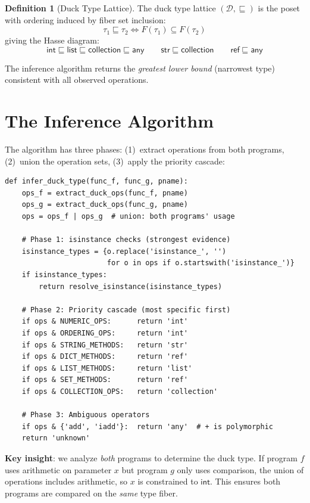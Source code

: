 \documentclass[11pt,a4paper]{report}
\theoremstyle{definition}
\newtheorem{definition}{Definition}[chapter]
\theoremstyle{plain}
\begin{document}
\begin{definition}[Duck Type Lattice]
The duck type lattice $(\mathcal{D}, \sqsubseteq)$ is the poset
with ordering induced by fiber set inclusion:
\[
  \tau_1 \sqsubseteq \tau_2 \iff F(\tau_1) \subseteq F(\tau_2)
\]
giving the Hasse diagram:
\[
  \mathsf{int} \sqsubseteq \mathsf{list} \sqsubseteq
    \mathsf{collection} \sqsubseteq \mathsf{any}
  \qquad
  \mathsf{str} \sqsubseteq \mathsf{collection}
  \qquad
  \mathsf{ref} \sqsubseteq \mathsf{any}
\]
\end{definition}

The inference algorithm returns the \emph{greatest lower bound}
(narrowest type) consistent with all observed operations.

\section{The Inference Algorithm}

The algorithm has three phases: (1)~extract operations from both
programs, (2)~union the operation sets, (3)~apply the priority
cascade:

\begin{lstlisting}[caption={Duck type inference (from \texttt{duck.py})}]
def infer_duck_type(func_f, func_g, pname):
    ops_f = extract_duck_ops(func_f, pname)
    ops_g = extract_duck_ops(func_g, pname)
    ops = ops_f | ops_g  # union: both programs' usage

    # Phase 1: isinstance checks (strongest evidence)
    isinstance_types = {o.replace('isinstance_', '')
                        for o in ops if o.startswith('isinstance_')}
    if isinstance_types:
        return resolve_isinstance(isinstance_types)

    # Phase 2: Priority cascade (most specific first)
    if ops & NUMERIC_OPS:      return 'int'
    if ops & ORDERING_OPS:     return 'int'
    if ops & STRING_METHODS:   return 'str'
    if ops & DICT_METHODS:     return 'ref'
    if ops & LIST_METHODS:     return 'list'
    if ops & SET_METHODS:      return 'ref'
    if ops & COLLECTION_OPS:   return 'collection'

    # Phase 3: Ambiguous operators
    if ops & {'add', 'iadd'}:  return 'any'  # + is polymorphic
    return 'unknown'
\end{lstlisting}

\textbf{Key insight}: we analyze \emph{both} programs to determine
the duck type.  If program $f$ uses arithmetic on parameter $x$ but
program $g$ only uses comparison, the union of operations includes
arithmetic, so $x$ is constrained to $\mathsf{int}$.  This ensures
both programs are compared on the \emph{same} type fiber.
\end{document}
